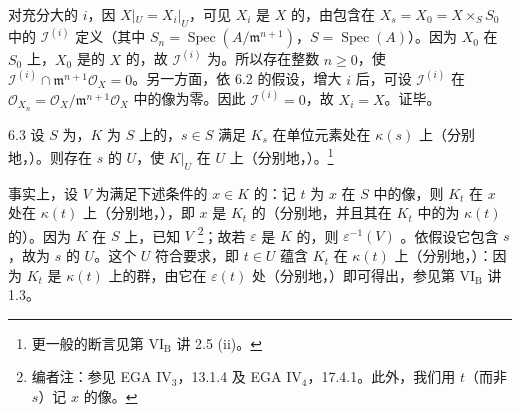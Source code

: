 对充分大的 $i$，因 $X|_U=X_i|_U$，可见 $X_i$ 是 $X$ 的，由包含在 $X_s=X_0=X\times_S S_0$ 中的 $\mathcal I^{(i)}$ 定义（其中 $S_n=\operatorname{Spec}(A/\mathfrak m^{n+1})$，$S=\operatorname{Spec}(A)$）。因为 $X_0$ 在 $S_0$ 上，$X_0$ 是的 $X$ 的，故 $\mathcal I^{(i)}$ 为。所以存在整数 $n\geq0$，使 $\mathcal I^{(i)}\cap\mathfrak m^{n+1}\mathcal O_X=0$。另一方面，依 6.2 的假设，增大 $i$ 后，可设 $\mathcal I^{(i)}$ 在 $\mathcal O_{X_n}=\mathcal O_X/\mathfrak m^{n+1}\mathcal O_X$ 中的像为零。因此 $\mathcal I^{(i)}=0$，故 $X_i=X$。证毕。
\begin{SGAresult}{}{6.3}
设 $S$ 为，$K$ 为 $S$ 上的，$s\in S$ 满足 $K_s$ 在单位元素处在 $\kappa(s)$ 上（分别地，）。则存在 $s$ 的 $U$，使 $K|_U$ 在 $U$ 上（分别地，）。\footnote{更一般的断言见第 VI$_{\mathrm B}$ 讲 2.5 (ii)。}
\end{SGAresult}
事实上，设 $V$ 为满足下述条件的 $x\in K$ 的：记 $t$ 为 $x$ 在 $S$ 中的像，则 $K_t$ 在 $x$ 处在 $\kappa(t)$ 上（分别地，），即 $x$ 是 $K_t$ 的（分别地，并且其在 $K_t$ 中的为 $\kappa(t)$ 的）。因为 $K$ 在 $S$ 上，已知 $V$ \footnote{编者注：参见 EGA IV$_3$，13.1.4 及 EGA IV$_4$，17.4.1。此外，我们用 $t$（而非 $s$）记 $x$ 的像。}；故若 $\varepsilon$ 是 $K$ 的，则 $\varepsilon^{-1}(V)$ 。依假设它包含 $s$，故为 $s$ 的 $U$。这个 $U$ 符合要求，即 $t\in U$ 蕴含 $K_t$ 在 $\kappa(t)$ 上（分别地，）：因为 $K_t$ 是 $\kappa(t)$ 上的群，由它在 $\varepsilon(t)$ 处（分别地，）即可得出，参见第 VI$_{\mathrm B}$ 讲 1.3。

